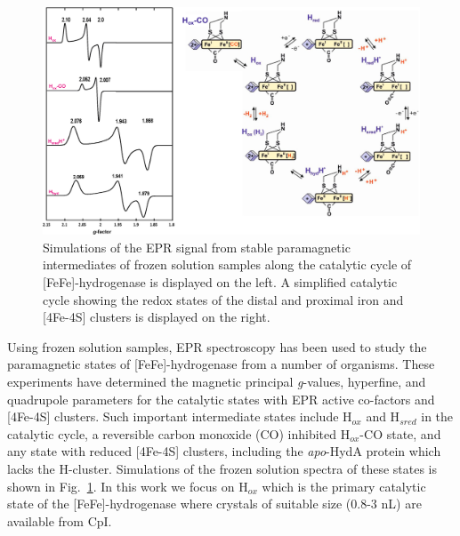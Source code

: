 \begin{figure}[htbp]
\centering
 \includegraphics[width=\textwidth]{Kapitel/end-images/Ch6-EPRCat.eps}
 \caption[EPR Signals along the catalytic cycle of FeFe-Hydrogenase.]{Simulations of the EPR signal from stable paramagnetic intermediates of frozen solution samples along the catalytic cycle of [FeFe]-hydrogenase is displayed on the left. A simplified catalytic cycle showing the redox states of the distal and proximal iron and [4Fe-4S] clusters is displayed on the right.} 
 \label{fig:FeFeCatCycle}
\end{figure}

Using frozen solution samples, EPR spectroscopy has been used to study the paramagnetic states of [FeFe]-hydrogenase from a number of organisms. \cite{lubitzhyd,Silakov57Fe,Adamska2015pdt,Adamska2015} These experiments have determined the magnetic principal \textit{g}-values, hyperfine, and quadrupole parameters for the catalytic states with EPR active co-factors and [4Fe-4S] clusters. Such important intermediate states include H$_{ox}$ and H$_{sred}$ in the catalytic cycle, a reversible carbon monoxide (CO) inhibited H$_{ox}$-CO state, and any state with reduced [4Fe-4S] clusters, including the \textit{apo}-HydA protein which lacks the H-cluster. Simulations of the frozen solution spectra of these states is shown in Fig.~\ref{fig:FeFeCatCycle}. In this work we focus on H$_{ox}$ which is the primary catalytic state of the [FeFe]-hydrogenase where crystals of suitable size (0.8-3 nL) are available from CpI.

